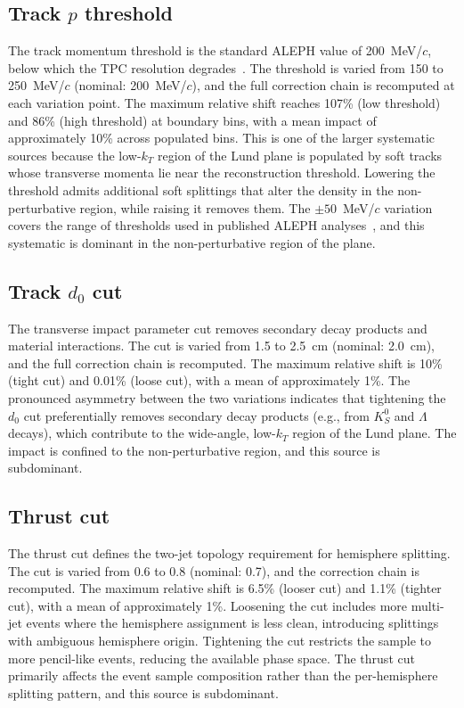 \documentclass[11pt,a4paper]{article}
\begin{document}
\subsection{Track $p$ threshold}
\label{sec:syst-p-threshold}

The track momentum threshold is the standard ALEPH value of
200~MeV/$c$, below which the TPC resolution degrades~\cite{ALEPH:1998hhr}.
The threshold is varied from 150 to 250~MeV/$c$ (nominal: 200~MeV/$c$),
and the full correction chain is recomputed at each variation point.  The
maximum relative shift reaches 107\% (low threshold) and 86\% (high
threshold) at boundary bins, with a mean impact of approximately 10\%
across populated bins.  This is one of the larger systematic sources because
the low-$k_T$ region of the Lund plane is populated by soft tracks whose
transverse momenta lie near the reconstruction threshold.  Lowering the
threshold admits additional soft splittings that alter the density in the
non-perturbative region, while raising it removes them.  The $\pm 50$~MeV/$c$
variation covers the range of thresholds used in published ALEPH
analyses~\cite{ALEPH:1998hhr}, and this systematic is dominant in the
non-perturbative region of the plane.

\subsection{Track $d_0$ cut}
\label{sec:syst-d0}

The transverse impact parameter cut removes secondary decay products
and material interactions.  The cut is varied from 1.5 to 2.5~cm
(nominal: 2.0~cm), and the full correction chain is recomputed.  The
maximum relative shift is 10\% (tight cut) and 0.01\% (loose cut),
with a mean of approximately 1\%.  The pronounced asymmetry between
the two variations indicates that tightening the $d_0$ cut
preferentially removes secondary decay products (e.g., from
$K^0_S$ and $\Lambda$ decays), which contribute to the wide-angle,
low-$k_T$ region of the Lund plane.  The impact is confined to the
non-perturbative region, and this source is subdominant.

\subsection{Thrust cut}
\label{sec:syst-thrust}

The thrust cut defines the two-jet topology requirement for
hemisphere splitting.  The cut is varied from 0.6 to 0.8 (nominal:
0.7), and the correction chain is recomputed.  The maximum relative
shift is 6.5\% (looser cut) and 1.1\% (tighter cut), with a mean of
approximately 1\%.  Loosening the cut includes more multi-jet events
where the hemisphere assignment is less clean, introducing splittings
with ambiguous hemisphere origin.  Tightening the cut restricts the
sample to more pencil-like events, reducing the available phase space.
The thrust cut primarily affects the event sample composition rather
than the per-hemisphere splitting pattern, and this source is
subdominant.
\end{document}
